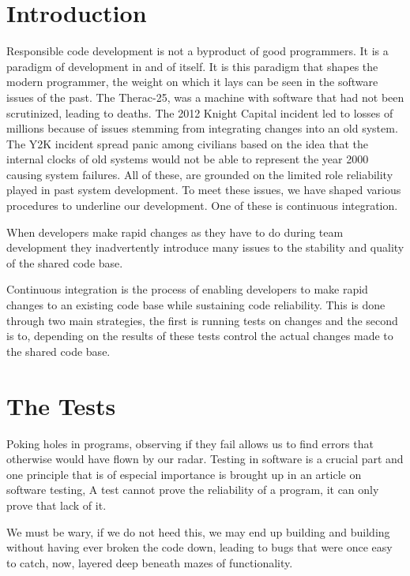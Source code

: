 \documentclass{article}
\begin{document}
\tableofcontents
\newpage
\section{Introduction}
Responsible code development is not a byproduct of good programmers.
It is a paradigm of development in and of itself. It is this paradigm that shapes
the modern programmer, the weight on which it lays can be seen in the software issues of the past.
The Therac-25, was a machine with software that had not been scrutinized, leading to deaths. The 2012 Knight Capital incident
led to losses of millions because of issues stemming from integrating changes into an old system. The Y2K incident
spread panic among civilians based on the idea that the internal clocks of old systems would not be able to represent
the year 2000 causing system failures. All of these, are grounded on the limited role reliability played in past system development.
To meet these issues, we have shaped various procedures to underline our development. One of these is continuous integration.

When developers make rapid changes as they have to do during team development 
they inadvertently introduce many issues to the stability and quality of the shared code base.

Continuous integration is the process of enabling developers to make rapid changes to an existing code base while sustaining
code reliability. This is done through two main strategies, the first is running tests on changes and the second is to, 
depending on the results of these tests control the actual changes made to the shared code base.

\section{The Tests}

Poking holes in programs, observing if they fail allows us to find errors that otherwise would
have flown by our radar. Testing in software is a crucial part and one principle that is of especial
importance is brought up in an article on software testing, A test cannot prove the reliability of a program, it 
can only prove that lack of it.\cite{meyer_seven_2008}

We must be wary, if we do not heed this, we may end up building and building without having ever broken the code down, 
leading to bugs that were once easy to catch, now, layered deep beneath mazes of functionality.
\end{document}
